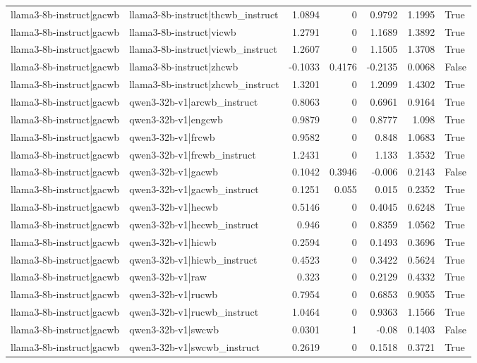\begin{table}
\begin{tabular}{l l r r r r l}
llama3-8b-instruct|gacwb & llama3-8b-instruct|thcwb_instruct & 1.0894 & 0 & 0.9792 & 1.1995 & True \\
llama3-8b-instruct|gacwb & llama3-8b-instruct|vicwb & 1.2791 & 0 & 1.1689 & 1.3892 & True \\
llama3-8b-instruct|gacwb & llama3-8b-instruct|vicwb_instruct & 1.2607 & 0 & 1.1505 & 1.3708 & True \\
llama3-8b-instruct|gacwb & llama3-8b-instruct|zhcwb & -0.1033 & 0.4176 & -0.2135 & 0.0068 & False \\
llama3-8b-instruct|gacwb & llama3-8b-instruct|zhcwb_instruct & 1.3201 & 0 & 1.2099 & 1.4302 & True \\
llama3-8b-instruct|gacwb & qwen3-32b-v1|arcwb_instruct & 0.8063 & 0 & 0.6961 & 0.9164 & True \\
llama3-8b-instruct|gacwb & qwen3-32b-v1|engcwb & 0.9879 & 0 & 0.8777 & 1.098 & True \\
llama3-8b-instruct|gacwb & qwen3-32b-v1|frcwb & 0.9582 & 0 & 0.848 & 1.0683 & True \\
llama3-8b-instruct|gacwb & qwen3-32b-v1|frcwb_instruct & 1.2431 & 0 & 1.133 & 1.3532 & True \\
llama3-8b-instruct|gacwb & qwen3-32b-v1|gacwb & 0.1042 & 0.3946 & -0.006 & 0.2143 & False \\
llama3-8b-instruct|gacwb & qwen3-32b-v1|gacwb_instruct & 0.1251 & 0.055 & 0.015 & 0.2352 & True \\
llama3-8b-instruct|gacwb & qwen3-32b-v1|hecwb & 0.5146 & 0 & 0.4045 & 0.6248 & True \\
llama3-8b-instruct|gacwb & qwen3-32b-v1|hecwb_instruct & 0.946 & 0 & 0.8359 & 1.0562 & True \\
llama3-8b-instruct|gacwb & qwen3-32b-v1|hicwb & 0.2594 & 0 & 0.1493 & 0.3696 & True \\
llama3-8b-instruct|gacwb & qwen3-32b-v1|hicwb_instruct & 0.4523 & 0 & 0.3422 & 0.5624 & True \\
llama3-8b-instruct|gacwb & qwen3-32b-v1|raw & 0.323 & 0 & 0.2129 & 0.4332 & True \\
llama3-8b-instruct|gacwb & qwen3-32b-v1|rucwb & 0.7954 & 0 & 0.6853 & 0.9055 & True \\
llama3-8b-instruct|gacwb & qwen3-32b-v1|rucwb_instruct & 1.0464 & 0 & 0.9363 & 1.1566 & True \\
llama3-8b-instruct|gacwb & qwen3-32b-v1|swcwb & 0.0301 & 1 & -0.08 & 0.1403 & False \\
llama3-8b-instruct|gacwb & qwen3-32b-v1|swcwb_instruct & 0.2619 & 0 & 0.1518 & 0.3721 & True \\

\end{tabular}
\end{table}
